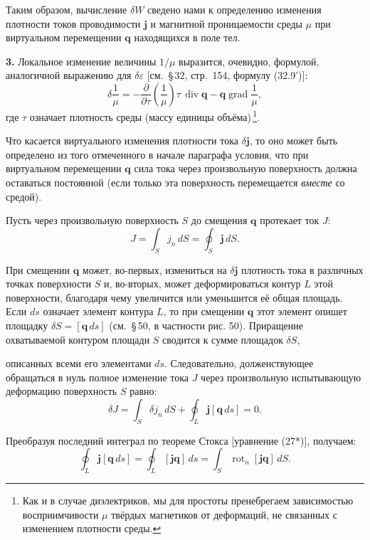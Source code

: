 \documentclass[a4paper,12pt]{article}
\begin{document}
Таким образом, вычисление $\delta W$ сведено нами к определению изменения
плотности токов проводимости $\mathbf{j}$ и магнитной проницаемости среды
$\mu$ при виртуальном перемещении $\mathbf{q}$ находящихся в поле тел.

\textbf{3.} Локальное изменение величины $1/\mu$ выразится, очевидно,
формулой, аналогичной выражению для $\delta\varepsilon$ [см.\ §\,32, стр.\ 154,
формулу (32.9')]:
$$
    \delta\frac{1}{\mu} = -\frac{\partial}{\partial\tau}\!\left(\frac{1}{\mu}\right)\tau\,
    \operatorname{div}\mathbf{q} - \mathbf{q}\operatorname{grad}\frac{1}{\mu},
$$
где $\tau$ означает плотность среды (массу единицы объёма)\,\footnote{Как
и в случае диэлектриков, мы для простоты пренебрегаем зависимостью
восприимчивости $\mu$ твёрдых магнетиков от деформаций, не связанных
с изменением плотности среды.}.

Что касается виртуального изменения плотности тока $\delta\mathbf{j}$,
то оно может быть определено из того отмеченного в начале параграфа
условия, что при виртуальном перемещении $\mathbf{q}$ сила тока через
произвольную поверхность должна оставаться постоянной (если только эта
поверхность перемещается \textit{вместе} со средой).

Пусть через произвольную поверхность $S$ до смещения $\mathbf{q}$
протекает ток $J$:
$$
    J = \int_S j_n\,dS = \oint_S \mathbf{j}\,dS.
$$

При смещении $\mathbf{q}$ может, во-первых, измениться на $\delta\mathbf{j}$
плотность тока в различных точках поверхности $S$ и, во-вторых, может
деформироваться контур $L$ этой поверхности, благодаря чему увеличится
или уменьшится её общая площадь. Если $ds$ означает элемент контура $L$,
то при смещении $\mathbf{q}$ этот элемент опишет площадку $\delta S =
[\mathbf{q}\,ds]$ (см.\ §\,50, в частности рис. 50). Приращение охватываемой
контуром площади $S$ сводится к сумме площадок $\delta S$,


описанных всеми его элементами $ds$. Следовательно, долженствующее
обращаться в нуль полное изменение тока $J$ через произвольную
испытывающую деформацию поверхность $S$ равно:
$$
    \delta J = \int_S \delta j_n\,dS + \oint_L \mathbf{j}[\mathbf{q}\,ds] = 0.
$$

Преобразуя последний интеграл по теореме Стокса [уравнение (27*)],
получаем:
$$
    \oint_L \mathbf{j}[\mathbf{q}\,ds]
    = \oint_L [\mathbf{j}\mathbf{q}]\,ds
    = \int_S \operatorname{rot}_n[\mathbf{j}\mathbf{q}]\,dS.
$$
\end{document}
